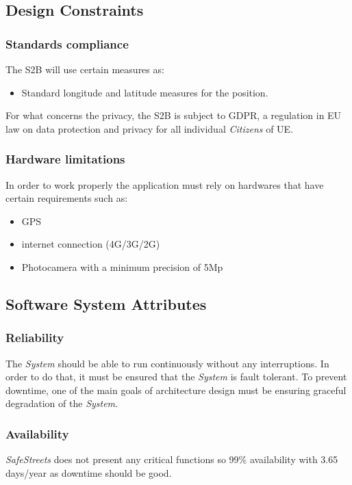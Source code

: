\documentclass{article}
\begin{document}
\subsection{Design Constraints}
\subsubsection{Standards compliance}
The S2B  will use certain measures as:
\begin{itemize}
    \item Standard longitude and latitude measures for the position.
\end{itemize}
For what concerns the privacy, the S2B is subject to GDPR, a regulation in EU law on data protection 
and privacy for all individual \textit{Citizens} of UE.  

\subsubsection{Hardware limitations}
In order to work properly the application must rely on hardwares that have certain requirements 
such as:
\begin{itemize}
    \item GPS
    \item internet connection (4G/3G/2G)
    \item Photocamera with a minimum precision of 5Mp 
\end{itemize}   

\subsection{Software System Attributes}

\subsubsection{Reliability}
The \textit{System} should be able to run continuously without any interruptions. In order to do that, it must be ensured 
that the \textit{System} is fault tolerant. To prevent downtime, one of the main goals of architecture design must be 
ensuring graceful degradation of the \textit{System}.

\subsubsection{Availability}
\textit{SafeStreets} does not present any critical functions so 99\% availability with 3.65 days/year
as downtime should be good.  
\end{document}
